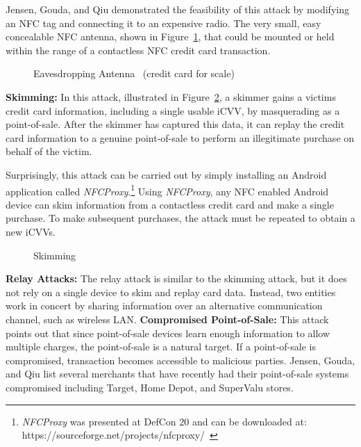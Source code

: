 \documentclass{sig-alternate}
\begin{document}
Jensen, Gouda, and Qiu demonstrated the feasibility of this attack by modifying an NFC tag and connecting it to an expensive radio. The very small, easy concealable NFC antenna, shown in Figure~\ref{fig:antenna}, that could be mounted or held within the range of a contactless NFC credit card transaction.
\begin{figure}
\centering
{}
\caption{Eavesdropping Antenna~\cite{CC2016} \newline(credit card for scale)}
\label{fig:antenna}
\end{figure}
\vspace{2mm}\newline
\noindent\textbf{Skimming:}
In this attack, illustrated in Figure~\ref{fig:skim}, a skimmer gains a victims credit card information, including a single usable iCVV, by masquerading as a point-of-sale. After the skimmer has captured this data, it can replay the credit card information to a genuine point-of-sale to perform an illegitimate purchase on behalf of the victim.

Surprisingly, this attack can be carried out by simply installing an Android application called \textit{NFCProxy}.\footnote{\textit{NFCProxy} was presented at DefCon 20 and can be downloaded at: https://sourceforge.net/projects/nfcproxy/~\cite{CC2016}}
Using \textit{NFCProxy}, any NFC enabled Android device can skim information from a contactless credit card and make a single purchase. To make subsequent purchases, the attack must be repeated to obtain a new iCVVs.
\begin{figure}
\centering
{}
\caption{Skimming~\cite{CC2016}}
\label{fig:skim}
\end{figure} 
\vspace{2mm}\newline
\noindent\textbf{Relay Attacks:}
The relay attack is similar to the skimming attack, but it does not rely on a single device to skim and replay card data. Instead, two entities work in concert by sharing information over an alternative communication channel, such as wireless LAN.
\vspace{2mm}\newline
\noindent\textbf{Compromised Point-of-Sale:}
This attack points out that since point-of-sale devices learn enough information to allow multiple charges, the point-of-sale is a natural target. If a point-of-sale is compromised, transaction becomes accessible to malicious parties. Jensen, Gouda, and Qiu list several merchants that have recently had their point-of-sale systems compromised including Target, Home Depot, and SuperValu stores.
\end{document}

